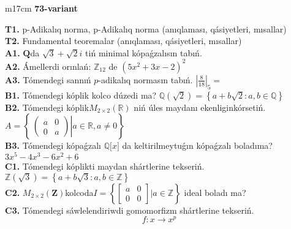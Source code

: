 \documentclass{article}
\begin{document}
\begin{tabular}{m{17cm}}
\textbf{73-variant}
\newline

\textbf{T1.} p-Adikalıq norma, p-Adikalıq norma (anıqlaması, qásiyetleri, mısallar) \\
\textbf{T2.} Fundamental teoremalar (anıqlaması, qásiyetleri, mısallar) \\
\textbf{A1.} \(\mathbf{Q}\)da \(\sqrt{3} + \sqrt{2}i\) tiń minimal kópaǵzalısın tabıń. \\
\textbf{A2.} Ámellerdi orınlań: \(\mathbb{Z}_{12}\) de \(\left( 5x^{2} + 3x - 2 \right)^{2}\) \\
\textbf{A3.} Tómendegi sannıń \(p\)-adikalıq normasın tabıń. \(|\frac{8}{18}|_{5} =\) \\
\textbf{B1.} Tómendegi kóplik kolco dúzedi ma? \(\mathbb{Q}\left( \sqrt{2} \right) = \left\{ a + b\sqrt{2}:a,b \in \mathbb{Q} \right\}\) \\
\textbf{B2.} Tómendegi kóplik\(M_{2 \times 2}\left( \mathbb{R} \right)\) niń úles maydanı ekenliginkórsetiń. \(A = \left\{ \left. \ \begin{pmatrix}
a & 0 \\
0 & a
\end{pmatrix} \right|a\mathbb{\in R},a \neq 0 \right\}\) \\
\textbf{B3.} Tómendegi kópaǵzalı \(\mathbb{Q\lbrack}x\rbrack\) da keltirilmeytuǵın kópaǵzalı boladıma? \(3x^{5} - 4x^{3} - 6x^{2} + 6\) \\
\textbf{C1.} Tómendegi kóplikti maydan shártlerine tekseriń. \(\mathbb{Z}\left( \sqrt{3} \right) = \left\{ a + b\sqrt{3}:a,b \in \mathbb{Z} \right\}\) \\
\textbf{C2.} \(M_{2 \times 2}\left( \mathbf{Z} \right)\)kolcoda\(I = \left\{ \begin{bmatrix}
a & 0 \\
0 & 0
\end{bmatrix}|a\mathbb{\in Z} \right\}\) ideal boladı ma? \\
\textbf{C3.} Tómendegi sáwlelendiriwdi gomomorfizm shártlerine tekseriń.
\[f:x \rightarrow x^{p}\] \\

\end{tabular}
\vspace{1cm}
\end{document}
